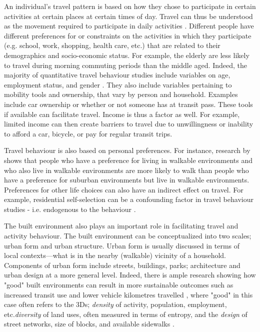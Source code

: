 An individual's travel pattern is based on how they chose to participate in certain activities at certain places at certain times of day. Travel can thus be understood as the movement required to participate in daily activities \cite{hanson_determinants_1982}. Different people have different preferences for or constraints on the activities in which they participate (e.g. school, work, shopping, health care, etc.) that are related to their demographics and socio-economic status. For example, the elderly are less likely to travel during morning commuting periods than the middle aged. Indeed, the majority of quantitative travel behaviour studies include variables on age, employment status, and gender \cite{hanson_determinants_1982}. They also include variables pertaining to mobility tools and ownership, that vary by person and household. Examples include car ownership or whether or not someone has at transit pass. These tools if available can facilitate travel. Income is thus a factor as well. For example, limited income can then create barriers to travel due to unwillingness or inability to afford a car, bicycle, or pay for regular transit trips.

Travel behaviour is also based on personal preferences. For instance, research by \cite{schwanen_what_2005} shows that people who have a preference for living in walkable environments and who also live in walkable environments are more likely to walk than people who have a preference for suburban environments but live in walkable environments. Preferences for other life choices can also have an indirect effect on travel. For example, residential self-selection can be a confounding factor in travel behaviour studies - i.e. endogenous to the behaviour \cite{cao_how_2016}.

The built environment also plays an important role in facilitating travel and activity behaviour. The built environment can be conceptualized into two scales; urban form and urban structure. Urban form is usually discussed in terms of local contexts---what is in the nearby (walkable) vicinity of a household. Components of urban form include streets, buildings, parks; architecture and urban design at a more general level. Indeed, there is ample research showing how "good" built environments can result in more sustainable outcomes such as increased transit use and lower vehicle kilometres travelled \cite{ewing_travel_2010,ewing_compactness_2015}, where "good" in this case often refers to the 3Ds; \textit{density} of activity, population, employment, etc.\textit{diversity} of land uses, often measured in terms of entropy, and the \textit{design} of street networks, size of blocks, and available sidewalks \cite{cervero_travel_1997}.


